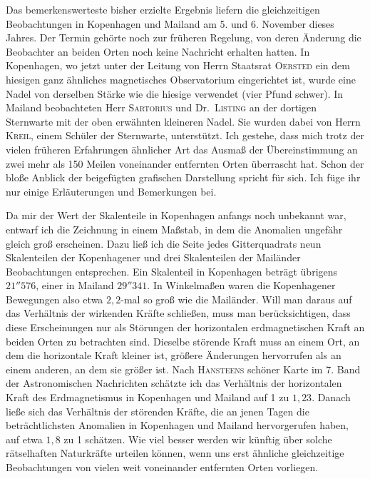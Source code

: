 Das bemerkenswerteste bisher erzielte Ergebnis liefern die gleichzeitigen Beobachtungen in Kopenhagen und Mailand am 5. und 6. November dieses Jahres. Der Termin gehörte noch zur früheren Regelung, von deren Änderung die Beobachter an beiden Orten noch keine Nachricht erhalten hatten. In Kopenhagen, wo jetzt unter der Leitung von Herrn Staatsrat \textsc{Oersted} ein dem hiesigen ganz ähnliches magnetisches Observatorium eingerichtet ist, wurde eine Nadel von derselben Stärke wie die hiesige verwendet (vier Pfund schwer). In Mailand beobachteten Herr \textsc{Sartorius} und Dr.\ \textsc{Listing} an der dortigen Sternwarte mit der oben erwähnten kleineren Nadel. Sie wurden dabei von Herrn \textsc{Kreil}, einem Schüler der Sternwarte, unterstützt. Ich gestehe, dass mich trotz der vielen früheren Erfahrungen ähnlicher Art das Ausmaß der Übereinstimmung an zwei mehr als 150 Meilen voneinander entfernten Orten überrascht hat. Schon der bloße Anblick der beigefügten grafischen Darstellung spricht für sich. Ich füge ihr nur einige Erläuterungen und Bemerkungen bei.

Da mir der Wert der Skalenteile in Kopenhagen anfangs noch unbekannt war, entwarf ich die Zeichnung in einem Maßstab, in dem die Anomalien ungefähr gleich groß erscheinen. Dazu ließ ich die Seite jedes Gitterquadrats neun Skalenteilen der Kopenhagener und drei Skalenteilen der Mailänder Beobachtungen entsprechen. Ein Skalenteil in Kopenhagen beträgt übrigens $21''576$, einer in Mailand $29''341$. In Winkelmaßen waren die Kopenhagener Bewegungen also etwa $2{,}2$-mal so groß wie die Mailänder. Will man daraus auf das Verhältnis der wirkenden Kräfte schließen, muss man berücksichtigen, dass diese Erscheinungen nur als Störungen der horizontalen erdmagnetischen Kraft an beiden Orten zu betrachten sind. Dieselbe störende Kraft muss an einem Ort, an dem die horizontale Kraft kleiner ist, größere Änderungen hervorrufen als an einem anderen, an dem sie größer ist. Nach \textsc{Hansteens} schöner Karte im 7. Band der Astronomischen Nachrichten schätzte ich das Verhältnis der horizontalen Kraft des Erdmagnetismus in Kopenhagen und Mailand auf
1 zu $1{,}23$. Danach ließe sich das Verhältnis der störenden Kräfte, die an jenen Tagen die beträchtlichsten Anomalien in Kopenhagen und Mailand hervorgerufen haben, auf etwa $1{,}8$ zu 1 schätzen. Wie viel besser werden wir künftig über solche rätselhaften Naturkräfte urteilen können, wenn uns erst ähnliche gleichzeitige Beobachtungen von vielen weit voneinander entfernten Orten vorliegen.

